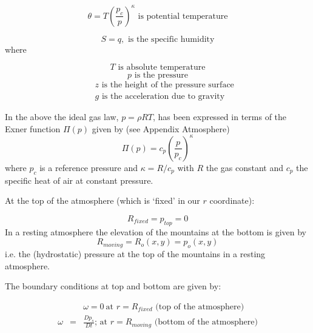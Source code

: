 \documentclass[12pt]{book}
\begin{document}
\begin{equation}
\theta =T(\frac{p_{c}}{p})^{\kappa }\text{ is potential temperature}
\label{eq:atmos-theta}
\end{equation}

\begin{equation}
S=q,\text{ is the specific humidity}  \label{eq:atmos-s}
\end{equation}
where

\begin{equation*}
T\text{ is absolute temperature}
\end{equation*}
\begin{equation*}
p\text{ is the pressure}
\end{equation*}
\begin{eqnarray*}
&&z\text{ is the height of the pressure surface} \\
&&g\text{ is the acceleration due to gravity}
\end{eqnarray*}

In the above the ideal gas law, $p=\rho RT$, has been expressed in terms of
the Exner function $\Pi (p)$ given by (see Appendix Atmosphere) 
\begin{equation}
\Pi (p)=c_{p}(\frac{p}{p_{c}})^{\kappa }  \label{eq:exner}
\end{equation}
where $p_{c}$ is a reference pressure and $\kappa =R/c_{p}$ with $R$ the gas
constant and $c_{p}$ the specific heat of air at constant pressure.

At the top of the atmosphere (which is `fixed' in our $r$ coordinate):

\begin{equation*}
R_{fixed}=p_{top}=0
\end{equation*}
In a resting atmosphere the elevation of the mountains at the bottom is
given by 
\begin{equation*}
R_{moving}=R_{o}(x,y)=p_{o}(x,y)
\end{equation*}
i.e. the (hydrostatic) pressure at the top of the mountains in a resting
atmosphere.

The boundary conditions at top and bottom are given by:

\begin{eqnarray}
&&\omega =0~\text{at }r=R_{fixed} \text{ (top of the atmosphere)}
\label{eq:fixed-bc-atmos} \\
\omega &=&\frac{Dp_{s}}{Dt}\text{; at }r=R_{moving}\text{ (bottom of the
atmosphere)}  \label{eq:moving-bc-atmos}
\end{eqnarray}
\end{document}
